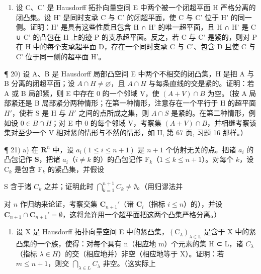 \begin{enumerate}
\def\labelenumi{\arabic{enumi})}
\setcounter{enumi}{18}
\tightlist
\item
  设 C、C' 是 Hausdorff 拓扑向量空间 E 中两个被一个闭超平面 H 严格分离的闭凸集。设 H' 是同时支承 C 与 C' 的闭超平面，使 C 与 C' 位于 H' 的同一侧。证明：H' 是具有这些性质且包含 H ∩ H' 的唯一超平面，且 H ∩ H' 是 C ∪ C' 的凸包在 H 上的迹 P 的支承超平面。反之，若 C 与 C' 是紧的，则对 P 在 H 中的每个支承超平面 D，存在一个同时支承 C 与 C'、包含 D 且使 C 与 C' 位于同一侧的超平面 H'。
\end{enumerate}

¶ 20) 设 A、B 是 Hausdorff 局部凸空间 E 中两个不相交的闭凸集，H 是把 A 与 B 分离的闭超平面；设 \(A \cap H \neq \varnothing\)，且 \(A \cap H\) 与每条直线的交是紧的。证明：若 A 或 B 局部紧，则 E 中存在 0 的一个邻域 V，使 \((A + V) \cap B\) 为空。（按 A 局部紧还是 B 局部紧分两种情形；在第一种情形，注意存在一个平行于 H 的超平面 \(H'\)，使若 S 是 H 与 \(H'\) 之间的点所成之集，则 \(A \cap S\) 是紧的。在第二种情形，例如设 \(0 \in B \cap H\)；对 E 中 0 的每个邻域 V，考察集 \((A + V) \cap B\)，并相继考察该集对至少一个 V 相对紧的情形与不然的情形，如 II, 第 67 页, 习题 16 那样。）

¶ 21) a) 在 \(\mathbf{R}^n\) 中，设 \(a_i (1 \leqslant i \leqslant n + 1)\) 是 \(n + 1\) 个仿射无关的点。把诸 \(a_i\) 的凸包记作 \(\mathbf{S}\)，把诸 \(a_i\)（\(i \neq k\) 的）的凸包记作 \(\mathrm{F}_k\)（\(1 \leqslant k \leqslant n + 1\)）。对每个 \(k\)，设 \(\mathrm{C}_k\) 是包含 \(\mathrm{F}_k\) 的紧凸集，并假设

S 含于诸 \(C_k\) 之并；证明此时 \(\bigcap_{k=1}^{n+1} C_k \neq \emptyset\)。（用归谬法并

对 \(n\) 作归纳来论证，考察交集 \(\mathbf{C}_{n+1}'\)（诸 \(\mathbf{C}_i\)（指标 \(i \leqslant n\)）的），并设 \(\mathbf{C}_{n+1} \cap \mathbf{C}_{n+1}' = \emptyset\)，这将允许用一个超平面把这两个凸集严格分离。）

\begin{enumerate}
\def\labelenumi{\alph{enumi})}
\setcounter{enumi}{1}
\tightlist
\item
  设 X 是 Hausdorff 拓扑向量空间 E 中的紧凸集，\((\mathrm{C}_{\lambda})_{\lambda\in\mathrm{L}}\) 是含于 X 中的紧凸集的一个族，使得：对每个具有 n（相应地 m）个元素的集 H ⊂ L，诸 \(C_{\lambda}\)（指标 \(\lambda\in H\)）的交（相应地并）非空（相应地等于 X）。证明：若 \(m\leqslant n+1\)，则交 \(\bigcap_{\lambda\in L}C_{\lambda}\) 非空。（这实际上
\end{enumerate}

